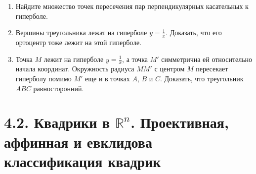 \begin{enumerate}
	\item Найдите множество точек пересечения пар перпендикулярных касательных к гиперболе.

	\item Вершины треугольника лежат на гиперболе $y = \frac{1}{x}$. Доказать, что его ортоцентр тоже лежит на этой гиперболе.

	\item Точка $M$ лежит на гиперболе $y = \frac{1}{x}$, а точка $M'$ симметрична ей относительно начала координат. Окружность радиуса $MM'$ с центром $M$ пересекает гиперболу помимо $M'$ еще и в точках $A$, $B$ и $C$. Доказать, что треугольник $ABC$ равносторонний.
\end{enumerate}

\section{4.2. Квадрики в $\mathbb{R}^n$. Проективная, аффинная и евклидова классификация квадрик}

